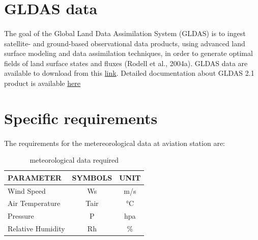 \section{GLDAS data}
\paragraph{}
The goal of the Global Land Data Assimilation System (GLDAS) is to ingest satellite- and ground-based observational data products, using advanced land surface modeling and data assimilation techniques, in order to generate optimal fields of land surface states and fluxes (Rodell et al., 2004a).
GLDAS data are available to download from this \href{https://hydro1.gesdisc.eosdis.nasa.gov/data/GLDAS/GLDAS_NOAH025_3H.2.1/}{link}.
Detailed documentation about GLDAS 2.1 product is available \href{https://hydro1.gesdisc.eosdis.nasa.gov/data/GLDAS/GLDAS_NOAH025_3H.2.1/doc/README_GLDAS2.pdf.}{here}  
\section{Specific requirements}
\paragraph{}
The requirements for the metereorological data at aviation station are:
\begin{table}[H]
\caption{meteorological data required}
\label{tab:meteorological data required}
\begin{center}
\begin{tabular}{| l | c | c |}
\hline
\textbf{PARAMETER} & \textbf{SYMBOLS} & \textbf{UNIT}\\[2pt] \hline
Wind Speed & Ws&  m/s\\\hline
Air Temperature & Tair  & °C \\\hline
Pressure & P & hpa\\\hline
Relative Humidity & Rh  &   \% \\ \hline
\end{tabular}
\end{center}
\end{table}
